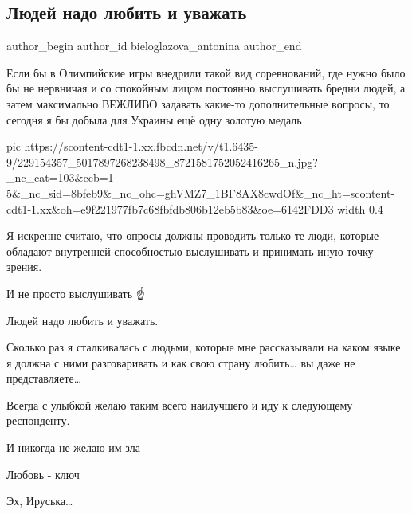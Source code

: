  
 
 
 
 
 
\subsection{Людей надо любить и уважать}
\label{sec:04_08_2021.fb.bieloglazova_antonina.1.oprosy_ljudi}
 
\ifcmt
 author_begin
   author_id bieloglazova_antonina
 author_end
\fi

Если бы в Олимпийские игры внедрили такой вид соревнований, где нужно было бы
не нервничая и со спокойным лицом постоянно выслушивать бредни людей, а затем
максимально ВЕЖЛИВО задавать какие-то дополнительные вопросы, то сегодня я бы
добыла для Украины ещё одну золотую медаль 🥇 

\ifcmt
  pic https://scontent-cdt1-1.xx.fbcdn.net/v/t1.6435-9/229154357_5017897268238498_8721581752052416265_n.jpg?_nc_cat=103&ccb=1-5&_nc_sid=8bfeb9&_nc_ohc=ghVMZ7_1BF8AX8cwdOf&_nc_ht=scontent-cdt1-1.xx&oh=e9f221977fb7c68fbfdb806b12eb5b83&oe=6142FDD3
  width 0.4
\fi

Я искренне считаю, что опросы должны проводить только те люди, которые обладают
внутренней способностью выслушивать и принимать иную точку зрения.

И не просто выслушивать ☝️

Людей надо любить и уважать.

Сколько раз я сталкивалась с людьми, которые мне рассказывали на каком языке я
должна с ними разговаривать и как свою страну любить… вы даже не представляете…

Всегда с улыбкой желаю таким всего наилучшего и иду к следующему респонденту. 

И никогда не желаю им зла 🙌

Любовь - ключ 🤗

Эх, Ируська…
